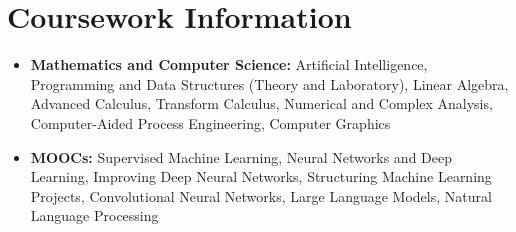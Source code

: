 \documentclass[a4paper,10pt]{article}
\begin{document}
\vspace{-5mm}

\section{\textbf{Coursework Information}}
\vspace{2pt}
\begin{itemize}[leftmargin=0.05in, label={}]
\item \textbf{Mathematics and Computer Science:} Artificial Intelligence, Programming and Data Structures (Theory and Laboratory), Linear Algebra, Advanced Calculus, Transform Calculus, Numerical and Complex Analysis, Computer-Aided Process Engineering, Computer Graphics
\vspace{-5pt}
\item \textbf{MOOCs:} Supervised Machine Learning, Neural Networks and Deep Learning, Improving Deep Neural Networks, Structuring Machine Learning Projects, Convolutional Neural Networks, Large Language Models, Natural Language Processing
\end{itemize}

\vspace{-5mm}
\end{document}
